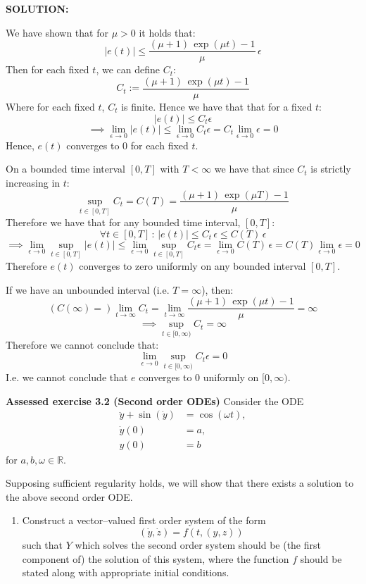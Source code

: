 \documentclass[]{article}
\begin{document}
\noindent\textbf{SOLUTION:}\newline

\noindent We have shown that for $\mu>0$ it holds that:
\[
|e(t)| \leq \frac{(\mu+1)\,\exp(\mu t)-1}{\mu}\,\epsilon
\]
\noindent Then for each fixed $t$, we can define $C_t$:
\[
C_t:= \frac{(\mu+1)\,\exp(\mu t)-1}{\mu}
\]
\noindent Where for each fixed $t$, $C_t$ is finite. Hence we have that that for a fixed $t$:
\[
|e(t)| \leq C_t \epsilon\]
\[\implies \displaystyle \lim_{\epsilon \to 0} |e(t)|  \leq \displaystyle \lim_{\epsilon \to 0}  C_t \epsilon =  C_t \lim_{\epsilon \to 0}  \epsilon  = 0
\]
\noindent Hence, $e(t)$ converges to $0$ for each fixed $t$.\newline

\noindent On a bounded time interval $[0,T]$ with $T<\infty$ we have that since $C_t$ is strictly increasing in $t$:
 \[
  \sup_{t\in[0,T]} C_t = C(T) = \frac{(\mu+1)\,\exp(\mu T)-1}{\mu}
  \]
\noindent Therefore we have that for any bounded time interval, $[0,T]$:
\[
\forall t\in [0,T] \,:\,|e(t)| \leq C_t\,\epsilon \le C(T)\,\epsilon
\]
  \[
\implies  \displaystyle \lim_{\epsilon\to 0} \sup_{t\in[0,T]} |e(t)| \leq \lim_{\epsilon\to 0}  \sup_{t\in[0,T]} C_t \epsilon = \displaystyle \lim_{\epsilon\to 0} C(T)\,\epsilon=C(T) \displaystyle \lim_{\epsilon\to 0}\epsilon=0
  \]
\noindent Therefore $e(t)$ converges to zero uniformly on any bounded interval $[0,T]$.\newline

\noindent If we have an unbounded interval (i.e. $T= \infty$), then:
\[
(C(\infty) = ) \displaystyle \lim_{t\to \infty} C_t = \displaystyle \lim_{t\to \infty}\frac{(\mu+1)\,\exp({\mu t})-1}{\mu} = \infty
\]
\[
\implies   \sup_{t\in[0,\infty)} C_t = \infty
\]
\noindent Therefore we cannot conclude that:
\[
 \displaystyle \lim_{\epsilon\to 0}\sup_{t\in[0,\infty)} C_t \epsilon = 0
\]
\noindent I.e. we cannot conclude that $e$ converges to $0$ uniformly on $[0,\infty)$.

\newpage
\noindent\textbf{Assessed exercise 3.2 (Second order ODEs)}
Consider the ODE
\[
\begin{aligned}
    \ddot y + \sin(\dot y) &= \cos(\omega t),\\ \dot y(0)&=a,\\ y(0)&=b
\end{aligned}
\]
for $a,b,\omega\in\mathbb{R}$.

Supposing sufficient regularity holds, we will show that there exists a solution to the above second order ODE.
\begin{enumerate}
\item Construct a vector–valued first order system of the form
\[
(\dot y,\dot z)=f\left(t,(y,z)\right)
\]
such that $Y$ which solves the second order system should be (the first component of) the solution of this system, where the function $f$ should be stated along with appropriate initial conditions.
\end{enumerate}
\end{document}
